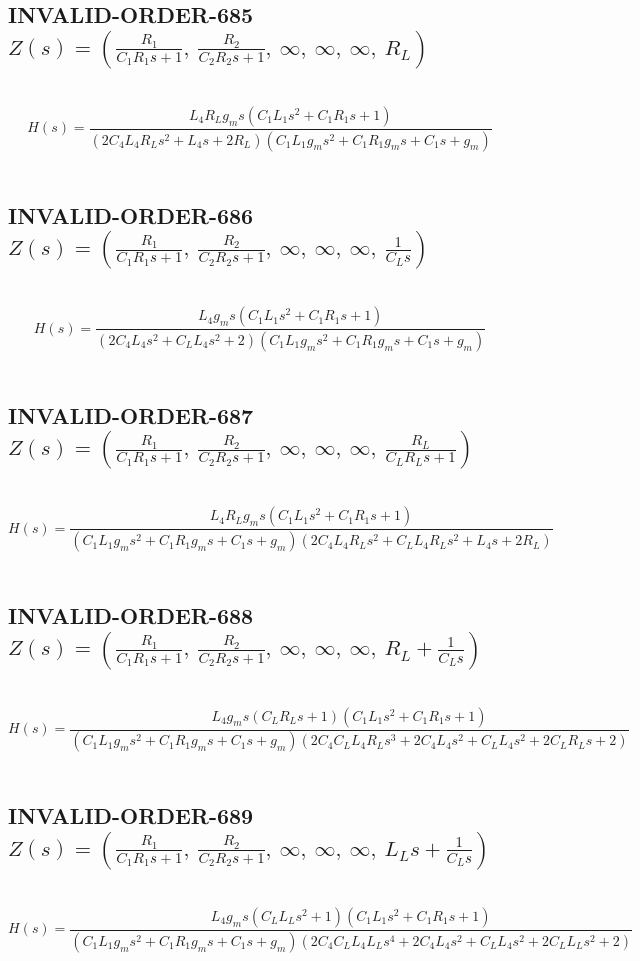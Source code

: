 \documentclass{article}
\begin{document}
\subsection{INVALID-ORDER-685 $Z(s) = \left( \frac{R_{1}}{C_{1} R_{1} s + 1}, \  \frac{R_{2}}{C_{2} R_{2} s + 1}, \  \infty, \  \infty, \  \infty, \  R_{L}\right)$ } \ 
\textbf{\[H(s) = \frac{L_{4} R_{L} g_{m} s \left(C_{1} L_{1} s^{2} + C_{1} R_{1} s + 1\right)}{\left(2 C_{4} L_{4} R_{L} s^{2} + L_{4} s + 2 R_{L}\right) \left(C_{1} L_{1} g_{m} s^{2} + C_{1} R_{1} g_{m} s + C_{1} s + g_{m}\right)}\] } \ 
\subsection{INVALID-ORDER-686 $Z(s) = \left( \frac{R_{1}}{C_{1} R_{1} s + 1}, \  \frac{R_{2}}{C_{2} R_{2} s + 1}, \  \infty, \  \infty, \  \infty, \  \frac{1}{C_{L} s}\right)$ } \ 
\textbf{\[H(s) = \frac{L_{4} g_{m} s \left(C_{1} L_{1} s^{2} + C_{1} R_{1} s + 1\right)}{\left(2 C_{4} L_{4} s^{2} + C_{L} L_{4} s^{2} + 2\right) \left(C_{1} L_{1} g_{m} s^{2} + C_{1} R_{1} g_{m} s + C_{1} s + g_{m}\right)}\] } \ 
\subsection{INVALID-ORDER-687 $Z(s) = \left( \frac{R_{1}}{C_{1} R_{1} s + 1}, \  \frac{R_{2}}{C_{2} R_{2} s + 1}, \  \infty, \  \infty, \  \infty, \  \frac{R_{L}}{C_{L} R_{L} s + 1}\right)$ } \ 
\textbf{\[H(s) = \frac{L_{4} R_{L} g_{m} s \left(C_{1} L_{1} s^{2} + C_{1} R_{1} s + 1\right)}{\left(C_{1} L_{1} g_{m} s^{2} + C_{1} R_{1} g_{m} s + C_{1} s + g_{m}\right) \left(2 C_{4} L_{4} R_{L} s^{2} + C_{L} L_{4} R_{L} s^{2} + L_{4} s + 2 R_{L}\right)}\] } \ 
\subsection{INVALID-ORDER-688 $Z(s) = \left( \frac{R_{1}}{C_{1} R_{1} s + 1}, \  \frac{R_{2}}{C_{2} R_{2} s + 1}, \  \infty, \  \infty, \  \infty, \  R_{L} + \frac{1}{C_{L} s}\right)$ } \ 
\textbf{\[H(s) = \frac{L_{4} g_{m} s \left(C_{L} R_{L} s + 1\right) \left(C_{1} L_{1} s^{2} + C_{1} R_{1} s + 1\right)}{\left(C_{1} L_{1} g_{m} s^{2} + C_{1} R_{1} g_{m} s + C_{1} s + g_{m}\right) \left(2 C_{4} C_{L} L_{4} R_{L} s^{3} + 2 C_{4} L_{4} s^{2} + C_{L} L_{4} s^{2} + 2 C_{L} R_{L} s + 2\right)}\] } \ 
\subsection{INVALID-ORDER-689 $Z(s) = \left( \frac{R_{1}}{C_{1} R_{1} s + 1}, \  \frac{R_{2}}{C_{2} R_{2} s + 1}, \  \infty, \  \infty, \  \infty, \  L_{L} s + \frac{1}{C_{L} s}\right)$ } \ 
\textbf{\[H(s) = \frac{L_{4} g_{m} s \left(C_{L} L_{L} s^{2} + 1\right) \left(C_{1} L_{1} s^{2} + C_{1} R_{1} s + 1\right)}{\left(C_{1} L_{1} g_{m} s^{2} + C_{1} R_{1} g_{m} s + C_{1} s + g_{m}\right) \left(2 C_{4} C_{L} L_{4} L_{L} s^{4} + 2 C_{4} L_{4} s^{2} + C_{L} L_{4} s^{2} + 2 C_{L} L_{L} s^{2} + 2\right)}\] } \ 
\end{document}
